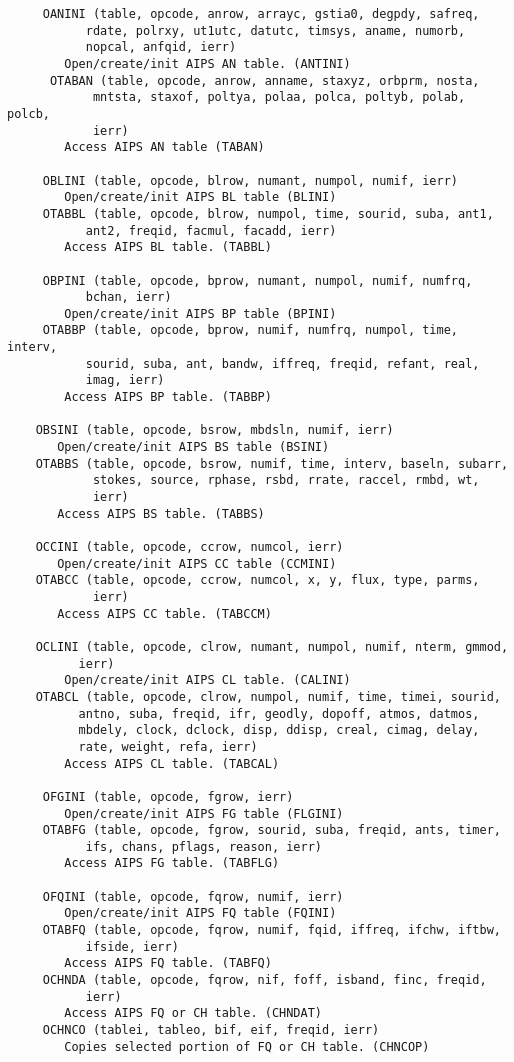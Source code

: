 {\small\begin{verbatim}
     OANINI (table, opcode, anrow, arrayc, gstia0, degpdy, safreq,
           rdate, polrxy, ut1utc, datutc, timsys, aname, numorb,
           nopcal, anfqid, ierr)
        Open/create/init AIPS AN table. (ANTINI)
      OTABAN (table, opcode, anrow, anname, staxyz, orbprm, nosta,
            mntsta, staxof, poltya, polaa, polca, poltyb, polab, polcb,
            ierr)
        Access AIPS AN table (TABAN)

     OBLINI (table, opcode, blrow, numant, numpol, numif, ierr)
        Open/create/init AIPS BL table (BLINI)
     OTABBL (table, opcode, blrow, numpol, time, sourid, suba, ant1,
           ant2, freqid, facmul, facadd, ierr)
        Access AIPS BL table. (TABBL)

     OBPINI (table, opcode, bprow, numant, numpol, numif, numfrq,
           bchan, ierr)
        Open/create/init AIPS BP table (BPINI)
     OTABBP (table, opcode, bprow, numif, numfrq, numpol, time, interv,
           sourid, suba, ant, bandw, iffreq, freqid, refant, real,
           imag, ierr)
        Access AIPS BP table. (TABBP)

    OBSINI (table, opcode, bsrow, mbdsln, numif, ierr)
       Open/create/init AIPS BS table (BSINI)
    OTABBS (table, opcode, bsrow, numif, time, interv, baseln, subarr,
            stokes, source, rphase, rsbd, rrate, raccel, rmbd, wt,
            ierr)
       Access AIPS BS table. (TABBS)

    OCCINI (table, opcode, ccrow, numcol, ierr)
       Open/create/init AIPS CC table (CCMINI)
    OTABCC (table, opcode, ccrow, numcol, x, y, flux, type, parms,
            ierr)
       Access AIPS CC table. (TABCCM)

    OCLINI (table, opcode, clrow, numant, numpol, numif, nterm, gmmod,
          ierr)
        Open/create/init AIPS CL table. (CALINI)
    OTABCL (table, opcode, clrow, numpol, numif, time, timei, sourid,
          antno, suba, freqid, ifr, geodly, dopoff, atmos, datmos,
          mbdely, clock, dclock, disp, ddisp, creal, cimag, delay,
          rate, weight, refa, ierr)
        Access AIPS CL table. (TABCAL)

     OFGINI (table, opcode, fgrow, ierr)
        Open/create/init AIPS FG table (FLGINI)
     OTABFG (table, opcode, fgrow, sourid, suba, freqid, ants, timer,
           ifs, chans, pflags, reason, ierr)
        Access AIPS FG table. (TABFLG)

     OFQINI (table, opcode, fqrow, numif, ierr)
        Open/create/init AIPS FQ table (FQINI)
     OTABFQ (table, opcode, fqrow, numif, fqid, iffreq, ifchw, iftbw,
           ifside, ierr)
        Access AIPS FQ table. (TABFQ)
     OCHNDA (table, opcode, fqrow, nif, foff, isband, finc, freqid,
           ierr)
        Access AIPS FQ or CH table. (CHNDAT)
     OCHNCO (tablei, tableo, bif, eif, freqid, ierr)
        Copies selected portion of FQ or CH table. (CHNCOP)


\end{verbatim}}
